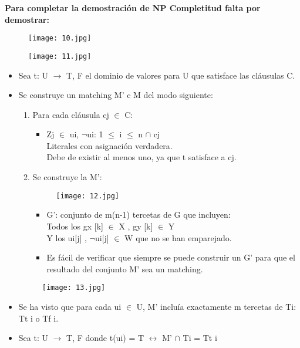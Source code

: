 \documentclass[a4paper,10pt]{article}
\begin{document}
\begin{itemize}
			\textbf{Para completar la demostración de NP Completitud falta por demostrar:}
			\begin{figure}[h!]
				\texttt{[image: 10.jpg]}
			\end{figure}
			\begin{figure}[h!]
				\texttt{[image: 11.jpg]}
			\end{figure}
			\begin{itemize}
					\item Sea t: U $\to$ { T, F } el dominio de valores para U que satisface las cláusulas C. 
					\item Se construye un matching M' c M del modo siguiente: 
						\begin{enumerate}
							\item Para cada cláusula cj $\in$ C: 
							\begin{itemize}
								\item Zj $\in$ {ui, $\neg$ui: 1 $\leq$ i $\leq$ n} $\cap$ cj 
									\\	Literales con asignación verdadera. 
									\\	Debe de existir al menos uno, ya que t satisface a cj. 
							\end{itemize}
							\item Se construye la M': 
							\begin{figure}[h!]
								\texttt{[image: 12.jpg]}
							\end{figure}
								\begin{itemize}
									\item G': conjunto de m(n-1) tercetas de G que incluyen:  
										\\	Todos los gx [k] $\in$ X , gy [k] $\in$ Y 
										\\  Y los ui[j] , $\neg$ui[j] $\in$ W que no se han emparejado. 
									\item Es fácil de verificar que siempre se puede construir un G' para que el resultado del conjunto M' sea un matching.
								\end{itemize}
						\end{enumerate}
						\begin{figure}[h!]
							\texttt{[image: 13.jpg]}
						\end{figure}
					\item Se ha visto que para cada ui $\in$ U, M' incluía exactamente m tercetas de Ti: Tt i o Tf i. 
					\item Sea t: U $\to$ { T, F } donde t(ui) = T $\leftrightarrow$ M' $\cap$ Ti = Tt i

\end{itemize}
\end{itemize}
\end{document}
